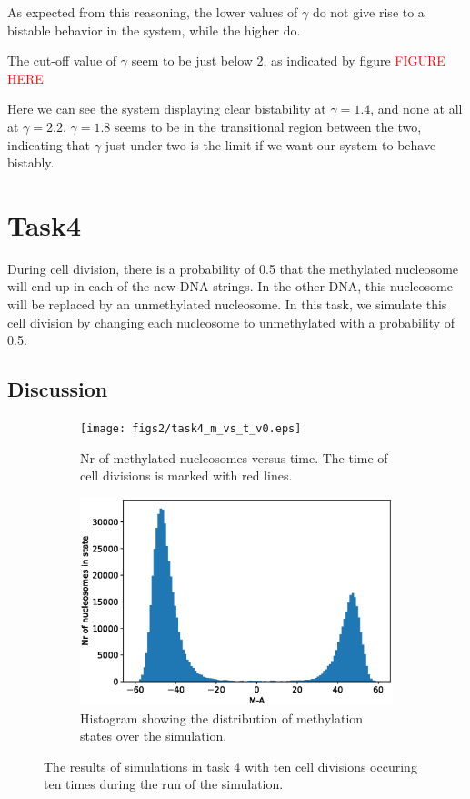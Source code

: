 \documentclass{article}
\begin{document}
As expected from this reasoning, the lower values of $\gamma$ do not give rise to a bistable behavior in the system, while the higher do. 

The cut-off value of $\gamma$ seem to be just below 2, as indicated by figure \textcolor{red}{FIGURE HERE}

Here we can see the system displaying clear bistability at $\gamma = 1.4$, and none at all at $\gamma= 2.2$. $\gamma= 1.8$ seems to be in the transitional region between the two, indicating that $\gamma$ just under two is the limit if we want our system to behave bistably. 








\section{Task4}
During cell division, there is a probability of 0.5 that the methylated nucleosome will end up in each of the new DNA strings. In the other DNA, this nucleosome will be replaced by an unmethylated nucleosome. 
In this task, we simulate this cell division by changing each nucleosome to unmethylated with a probability of 0.5.
\subsection{Discussion}

\begin{figure}[H]
	\centering
	\begin{subfigure}[b]{.49\textwidth}
		\centering
		\texttt{[image: figs2/task4\_m\_vs\_t\_v0.eps]}
		\caption{Nr of methylated nucleosomes versus time. The time of cell divisions is marked with red lines. }
		\label{fig:task4_m_vs_t}
	\end{subfigure}
	\begin{subfigure}[b]{.49\textwidth}
		\centering
		\includegraphics[width= \linewidth]{figs2/task4_hist_v0.eps}
		\caption{Histogram showing the distribution of methylation states over the simulation.}
		\label{fig:task4_hist}
	\end{subfigure}
		\caption{The results of simulations in task 4 with ten cell divisions occuring ten times during the run of the simulation. }
		\label{fig:task4}
\end{figure}
\end{document}
